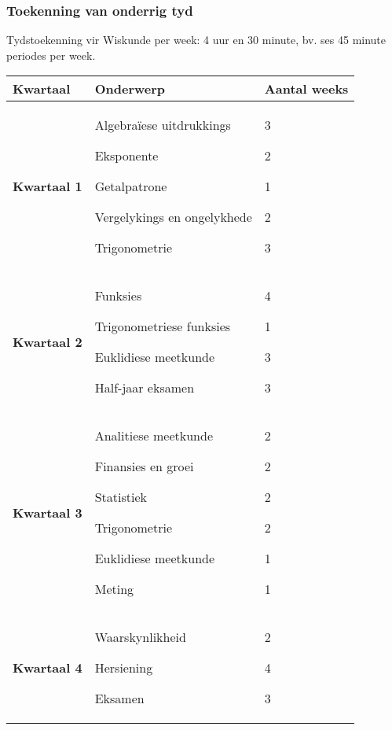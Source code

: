 \subsubsection{Toekenning van onderrig tyd}
Tydstoekenning vir Wiskunde per week: 4 uur en 30 minute, bv. ses 45 minute periodes per week.
\begin{table}[H]
 \begin{center} 
\begin{tabular}{|p{2cm}|p{6cm}|p{2cm}|} \hline
\textbf{Kwartaal}& \textbf{Onderwerp} & \textbf{Aantal weeks} \\ \hline  
\textbf{Kwartaal 1} & Algebra\"{i}ese uitdrukkings \par
Eksponente\par
Getalpatrone \par
Vergelykings en ongelykhede\par
Trigonometrie

&
3\par
2\par
1\par
2\par
3 \\ \hline
\textbf{Kwartaal 2} & Funksies \par
Trigonometriese funksies  \par
Euklidiese meetkunde  \par
Half-jaar eksamen &
4  \par
1 \par
3  \par
3  \\ \hline

\textbf{Kwartaal 3} & Analitiese meetkunde \par
Finansies en groei \par
Statistiek \par
Trigonometrie \par
Euklidiese meetkunde\par
Meting &
2 \par
2\par
2\par
2\par
1\par
1 \\ \hline
\textbf{Kwartaal 4} & Waarskynlikheid \par Hersiening \par Eksamen &
2 \par 
4 \par 
3 \\ \hline


 \end{tabular}
\end{center}
\end{table}

